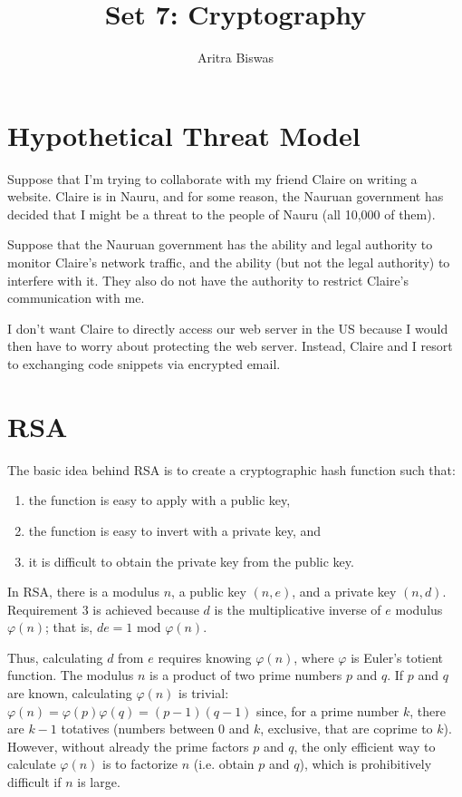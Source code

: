 \documentclass{article}
\title{\textbf{Set 7: Cryptography}}
\date{}
\author{Aritra Biswas}
\theoremstyle{definition}
\renewcommand{\>}{\rangle}
\newcommand{\<}{\langle}
\begin{document}
\maketitle

\section{Hypothetical Threat Model}

Suppose that I'm trying to collaborate with my friend Claire on writing a
website.
Claire is in Nauru, and for some reason, the Nauruan government has decided that
I might be a threat to the people of Nauru (all 10,000 of them).

Suppose that the Nauruan government has the ability and legal authority to
monitor Claire's network traffic, and the ability (but not the legal authority)
to interfere with it. They also do not have the authority to restrict
Claire's communication with me.

I don't want Claire to directly access our web server in the US because I would
then have to worry about protecting the web server. Instead, Claire and I resort
to exchanging code snippets via encrypted email.

\section{RSA}

The basic idea behind RSA is to create a cryptographic hash function such that:
\begin{enumerate}
\item the function is easy to apply with a public key,
\item the function is easy to invert with a private key, and
\item it is difficult to obtain the private key from the public key.
\end{enumerate}
In RSA, there is a modulus $n$, a public key $(n, e)$, and a private key $(n, d)$.
Requirement 3 is achieved because $d$ is the multiplicative inverse of $e$
modulus $\varphi(n)$; that is, $de = 1\text{ mod }\varphi(n)$.

Thus, calculating $d$
from $e$ requires knowing $\varphi(n)$, where $\varphi$ is Euler's totient function.
The modulus $n$ is a product of two prime numbers $p$ and $q$. If $p$ and $q$
are known, calculating $\varphi(n)$ is trivial: $\varphi(n) = \varphi(p)\varphi(q)
= (p-1)(q-1)$ since, for a prime number $k$, there are $k-1$ totatives
(numbers between $0$ and $k$, exclusive, that are coprime to $k$). However,
without already the prime factors $p$ and $q$, the only efficient way to
calculate $\varphi(n)$ is to factorize $n$ (i.e. obtain $p$ and $q$), which is
prohibitively difficult if $n$ is large.
\end{document}
